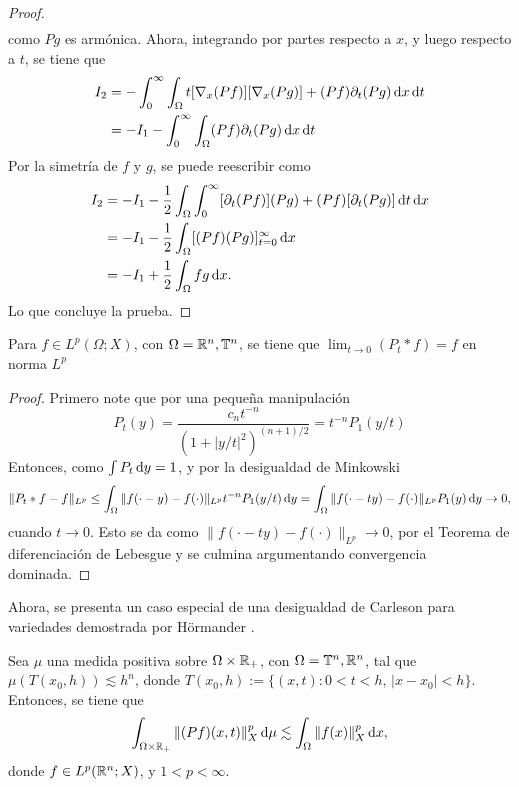 \begin{proof}
\begin{align*}
	\end{align*}
	como $Pg$ es armónica. Ahora, integrando por partes respecto a $x$, y luego respecto a $t$, se tiene que
	\begin{align*}
		I_2 & = - \int_0^\infty \int_{\Omega}   t [\nabla_x(Pf)][\nabla_x(Pg)]+(Pf)\partial_t(Pg)\mathop{}\!\mathrm{d} x \mathop{}\!\mathrm{d} t \\
		& = -I_1 - \int_0^\infty \int_{\Omega} (Pf)\partial_t(Pg)\mathop{}\!\mathrm{d} x \mathop{}\!\mathrm{d} t 
	\end{align*}
	Por la simetría de $f$ y $g$, se puede reescribir como 
	\begin{align*}
		I_2 & =  - I_1 -\frac{1}{2}\int_{\Omega}  \int_0^\infty [\partial_t(Pf)](Pg) + (Pf)[\partial_t(Pg)]\mathop{}\!\mathrm{d} t \mathop{}\!\mathrm{d} x \\
		& =  - I_1 -\frac{1}{2}\int_{\Omega} [(Pf)(Pg)]_{t=0}^\infty \mathop{}\!\mathrm{d} x \\
		&= -I_1 + \frac{1}{2}\int_{\Omega}fg\mathop{}\!\mathrm{d} x.
	\end{align*}
	Lo que concluye la prueba.
\end{proof}
\begin{theorem}
	Para $f \in L^p(\Omega;X)$, con $\Omega=\mathbb{R}^n, \mathbb{T}^n$, se tiene que $\lim_{t\to0}(P_t*f) = f$ en norma $L^p$
\end{theorem}
\begin{proof}
	Primero note que por una pequeña manipulación
	\begin{equation*}
		P_t(y) = \frac{c_nt^{-n}}{(1+|y/t|^2)^{(n+1)/2}} = t^{-n}P_1(y/t)
	\end{equation*}
	Entonces, como $\int P_t \mathop{}\!\mathrm{d} y = 1$, y por la desigualdad de Minkowski
	\begin{equation*}
		\|P_t*f - f\|_{L^p} \leq \int_{\Omega} \|f(\cdot-y)-f(\cdot)\|_{L^p} t^{-n}P_1(y/t) \mathop{}\!\mathrm{d} y = \int_{\Omega} \|f(\cdot-ty)-f(\cdot)\|_{L^p} P_1(y) \mathop{}\!\mathrm{d} y \to 0,
	\end{equation*}
	cuando $t\to0$. Esto se da como $\|f(\cdot-ty)-f(\cdot)\|_{L^p} \to 0$, por el Teorema de diferenciación de Lebesgue y se culmina argumentando convergencia dominada.
\end{proof}
Ahora, se presenta un caso especial de una desigualdad de Carleson para variedades demostrada por Hörmander \cite{hormander1967}.
\begin{lemma}\label{lem:Carleson}
	Sea $\mu$ una medida positiva sobre $\Omega\times\mathbb{R}_+$, con $\Omega=\mathbb{T}^n,\mathbb{R}^n$, tal que $\mu(T(x_0, h))\lesssim h^n$, donde $T(x_0, h) := \{(x, t): 0<t<h, \, |x-x_0| < h\}$. Entonces, se tiene que 
	\begin{equation*}
		\int_{\Omega\times\mathbb{R}_+} \|(Pf)(x, t)\|_X^p \mathop{}\!\mathrm{d} \mu \lesssim \int_{\Omega} \|f(x)\|_X^p\mathop{}\!\mathrm{d} x,
	\end{equation*}
	donde $f\in L^p(\mathbb{R}^n;X)$, y $1<p<\infty$.
\end{lemma}
